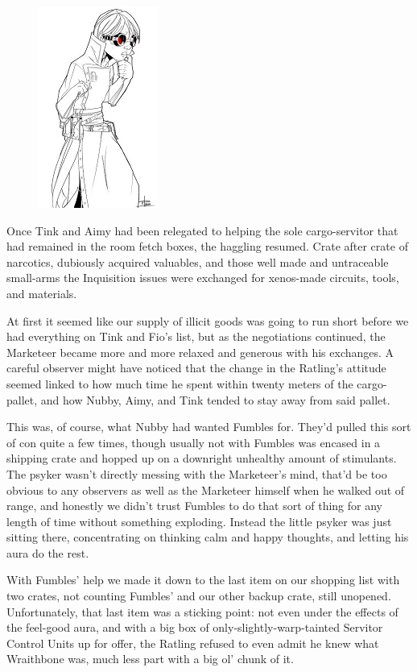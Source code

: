 \begin{figure}
	\begin{center}
		\includegraphics[width=\figwidth]{pics/14/20.png}
	\end{center}
\end{figure}
Once Tink and Aimy had been relegated to helping the sole cargo-servitor that had remained in the room fetch boxes, the haggling resumed. 
Crate after crate of narcotics, dubiously acquired valuables, and those well made and untraceable small-arms the Inquisition issues were exchanged for xenos-made circuits, tools, and materials.

At first it seemed like our supply of illicit goods was going to run short before we had everything on Tink and Fio's list, but as the negotiations continued, the Marketeer became more and more relaxed and generous with his exchanges. 
A careful observer might have noticed that the change in the Ratling's attitude seemed linked to how much time he spent within twenty meters of the cargo-pallet, and how Nubby, Aimy, and Tink tended to stay away from said pallet.

This was, of course, what Nubby had wanted Fumbles for. 
They'd pulled this sort of con quite a few times, though usually not with Fumbles was encased in a shipping crate and hopped up on a downright unhealthy amount of stimulants. 
The psyker wasn't directly messing with the Marketeer's mind, that'd be too obvious to any observers as well as the Marketeer himself when he walked out of range, and honestly we didn't trust Fumbles to do that sort of thing for any length of time without something exploding. 
Instead the little psyker was just sitting there, concentrating on thinking calm and happy thoughts, and letting his aura do the rest.

With Fumbles' help we made it down to the last item on our shopping list with two crates, not counting Fumbles' and our other backup crate, still unopened. 
Unfortunately, that last item was a sticking point: 
not even under the effects of the feel-good aura, and with a big box of only-slightly-warp-tainted Servitor Control Units up for offer, the Ratling refused to even admit he knew what Wraithbone was, much less part with a big ol' chunk of it. 


